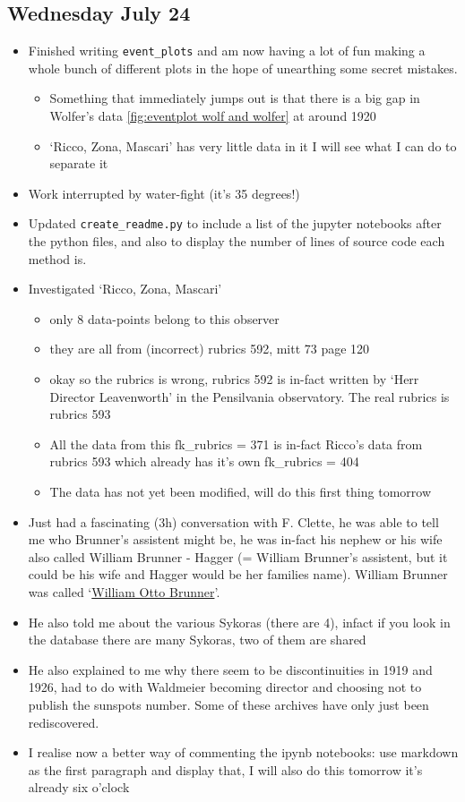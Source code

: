 \documentclass[12pt]{article}
\begin{document}
\subsection{Wednesday July 24}
\begin{itemize}
    \item Finished writing \texttt{event\_plots} and am now having a lot of fun making a whole bunch of different plots in the hope of unearthing some secret mistakes. 
    \begin{itemize}
        \item Something that immediately jumps out is that there is a big gap in Wolfer's data \ref{fig:eventplot wolf and wolfer} at around 1920
        \item `Ricco, Zona, Mascari' has very little data in it I will see what I can do to separate it
    \end{itemize}
    \item Work interrupted by water-fight (it's 35 degrees!)
    \item Updated \texttt{create\_readme.py} to include a list of the jupyter notebooks after the python files, and also to display the number of lines of source code each method is.
    \item Investigated `Ricco, Zona, Mascari'
    \begin{itemize}
        \item only 8 data-points belong to this observer
        \item they are all from (incorrect) rubrics 592, mitt 73 page 120
        \item okay so the rubrics is wrong, rubrics 592 is in-fact written by `Herr Director Leavenworth' in the Pensilvania observatory. The real rubrics is rubrics 593
        \item All the data from this fk\_rubrics = 371 is in-fact Ricco's data from rubrics 593 which already has it's own fk\_rubrics = 404
        \item The data has not yet been modified, will do this first thing tomorrow 
    \end{itemize}
    \item Just had a fascinating (3h) conversation with F. Clette, he was able to tell me who Brunner's assistent might be, he was in-fact his nephew or his wife also called William Brunner - Hagger (= William Brunner's assistent, but it could be his wife and Hagger would be her families name). William Brunner was called `\href{https://en.wikipedia.org/wiki/William_Otto_Brunner}{William Otto Brunner}'. 
    \item He also told me about the various Sykoras (there are 4), infact if you look in the database there are many Sykoras, two of them are shared 
    \item He also explained to me why there seem to be discontinuities in 1919 and 1926, had to do with Waldmeier becoming director and choosing not to publish the sunspots number. Some of these archives have only just been rediscovered.
    \item I realise now a better way of commenting the ipynb notebooks: use markdown as the first paragraph and display that, I will also do this tomorrow it's already six o'clock
\end{itemize}
\end{document}

